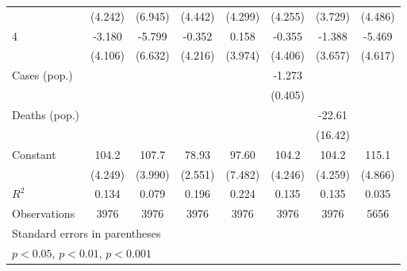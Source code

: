\documentclass{article}
\begin{document}
{\begin{longtable}{l*{7}{c}}
                &  (4.242)         &  (6.945)         &  (4.442)         &  (4.299)         &  (4.255)         &  (3.729)         &  (4.486)         \\
4               &   -3.180         &   -5.799         &   -0.352         &    0.158         &   -0.355         &   -1.388         &   -5.469         \\
                &  (4.106)         &  (6.632)         &  (4.216)         &  (3.974)         &  (4.406)         &  (3.657)         &  (4.617)         \\
Cases (pop.)    &                  &                  &                  &                  &   -1.273\sym{**} &                  &                  \\
                &                  &                  &                  &                  &  (0.405)         &                  &                  \\
Deaths (pop.)   &                  &                  &                  &                  &                  &   -22.61         &                  \\
                &                  &                  &                  &                  &                  &  (16.42)         &                  \\
Constant        &    104.2\sym{***}&    107.7\sym{***}&    78.93\sym{***}&    97.60\sym{***}&    104.2\sym{***}&    104.2\sym{***}&    115.1\sym{***}\\
                &  (4.249)         &  (3.990)         &  (2.551)         &  (7.482)         &  (4.246)         &  (4.259)         &  (4.866)         \\
\hline
\(R^{2}\)       &    0.134         &    0.079         &    0.196         &    0.224         &    0.135         &    0.135         &    0.035         \\
Observations    &     3976         &     3976         &     3976         &     3976         &     3976         &     3976         &     5656         \\
\hline\hline
\multicolumn{8}{l}{\footnotesize Standard errors in parentheses}\\
\multicolumn{8}{l}{\footnotesize \sym{*} \(p<0.05\), \sym{**} \(p<0.01\), \sym{***} \(p<0.001\)}\\
\end{longtable}
}
\end{document}
